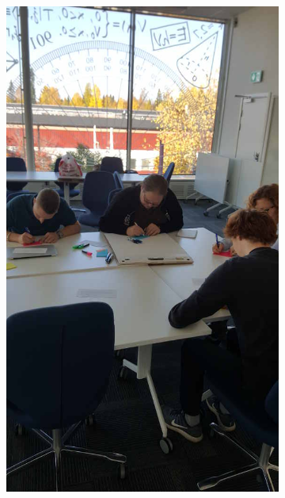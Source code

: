 \begin{figure}[hb]
\centering
    \begin{subfigure}{.32\textwidth}
        \centering
        \includegraphics[width=\textwidth, angle=270, origin=c]{img/workshop1_resized.jpg}
        \label{fig:workshop1}
    \end{subfigure}
    \begin{subfigure}{.32\textwidth}
        \centering

\end{subfigure}
\end{figure}
